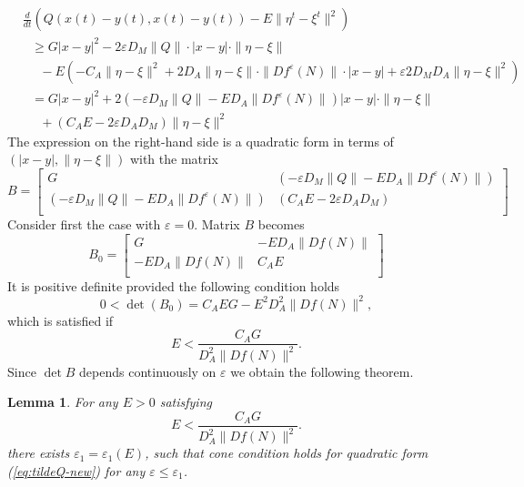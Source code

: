 \documentclass[11pt, leqno]{amsart}
\newtheorem{lem}[thm]{Lemma}
\theoremstyle{definition}
\begin{document}
\begin{align*}
&	\frac{d}{dt} \left( Q(x(t)-y(t),x(t)-y(t)) - E  \|\eta^t - \xi^t\|^2 \right) \\
&\ \ \ \geq 	G |x-y|^2 -2\varepsilon D_M \|Q\| \cdot |x-y| \cdot \|\eta - \xi\|   \\
&\ \ \ \ \ \ 	-  E \left(- C_A \|\eta - \xi\|^2  + 2 D_A\|\eta - \xi\| \cdot \|Df^\varepsilon (N)\| \cdot |x-y | + \varepsilon 2 D_M D_A \|\eta - \xi\|^2 \right) \\
&\ \ \ 	= G |x-y|^2  +  2\left(- \varepsilon D_M \|Q\|  -  E D_A \|Df^\varepsilon (N)\| \right) |x-y| \cdot \|\eta - \xi\| \\
&\ \ \ \ \ \ 	+ \left(C_AE - 2\varepsilon D_AD_M \right) \|\eta - \xi\|^2
\end{align*}
The expression on the right-hand side is a quadratic form in terms of $(|x-y|,\|\eta-\xi\|)$  with the matrix
\begin{equation}
	B= \left[
	\begin{array}{cc}
		G &   \left(- \varepsilon D_M \|Q\|  -  E D_A \|Df^\varepsilon (N)\| \right) \\
		\left(- \varepsilon D_M \|Q\|  -  E D_A \|Df^\varepsilon (N)\| \right) &  \left(C_AE - 2\varepsilon D_A D_M  \right) \\
	\end{array}
	\right]
\end{equation}
Consider first the case with $\varepsilon=0$. Matrix $B$ becomes
\begin{equation}
	B_0= \left[
	\begin{array}{cc}
		G &   -  E D_A \|Df (N)\|  \\
		-  E D_A \|Df (N)\| &  C_AE  \\
	\end{array}
	\right]
\end{equation}
It is positive definite provided the following condition holds
\begin{equation}
	0< \det(B_0) = C_AE G - E^2 D_A^2  \|Df (N)\|^2,
\end{equation}
which is satisfied if
\begin{equation}
	E < \frac{C_A G}{D_A^2  \|Df (N)\|^2}.
\end{equation}
Since $\det B$ depends continuously on $\varepsilon$ we obtain the following theorem.

\begin{lem}\label{lem:E1}
	For any $E>0$ satisfying
	\begin{equation}
		E < \frac{C_A G}{D_A^2  \|Df (N)\|^2}.
	\end{equation}
	there exists $\varepsilon_1=\varepsilon_1(E)$, such that cone condition holds for quadratic form (\ref{eq:tildeQ-new}) for any $\varepsilon \leq \varepsilon_1$.
\end{lem}
\end{document}
